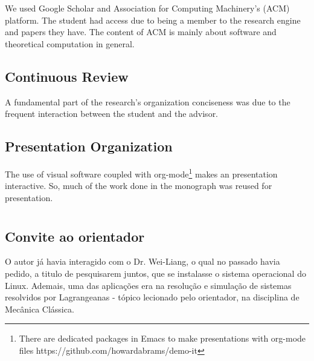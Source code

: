 \documentclass[
12pt,				%
openright,			%
oneside,			%
a4paper,			%
brazil,				%
english,			%
]{abntex2}
\begin{document}
We used Google Scholar and Association for Computing Machinery's (ACM)
platform. The student had access due to being a member to the research
engine and papers they have. The content of ACM is mainly about
software and theoretical computation in general. 

\section{Continuous Review}
A fundamental part of the research's organization conciseness was due
to the frequent interaction between the student and the advisor.

\section{Presentation Organization}
The use of visual software coupled with org-mode\footnote{There are
  dedicated packages in Emacs to make presentations with org-mode
  files https://github.com/howardabrams/demo-it} makes an presentation
interactive. So, much of the work done in the monograph was reused for presentation.

\chapter{}

\section{Convite ao orientador}
O autor já havia interagido com o Dr. Wei-Liang, o qual no passado
havia pedido, a titulo de pesquisarem juntos, que se instalasse o
sistema operacional do Linux. Ademais, uma das aplicações era na
resolução e simulação de sistemas resolvidos por Lagrangeanas - tópico
lecionado pelo orientador, na disciplina de Mecânica Clássica.
\end{document}
